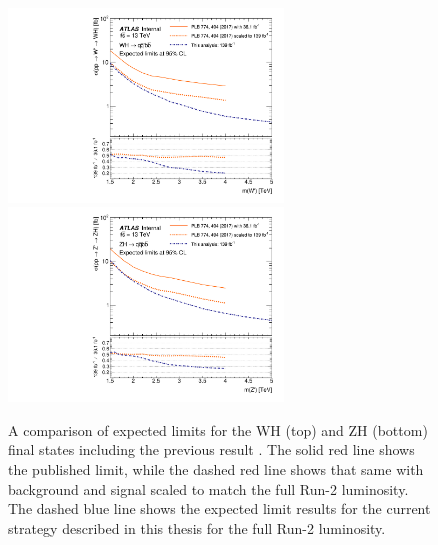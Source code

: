 \begin{figure}[htbp!]
    \begin{center}
        \includegraphics[width=0.65\textwidth]{VHqqbbLimit_WH_2016_2019_v4.pdf} \\
        \includegraphics[width=0.65\textwidth]{VHqqbbLimit_ZH_2016_2019_v4.pdf}
    \end{center}
    \caption{
        A comparison of expected limits for the WH (top) and ZH (bottom) final states including the previous result \cite{Aaboud:2017ahz}.
        The solid red line shows the published limit, while the dashed red line shows that same with background and signal scaled to match the full Run-2 luminosity.
        The dashed blue line shows the expected limit results for the current strategy described in this thesis for the full Run-2 luminosity.
    }
    \label{fig:exp_limit_cmp}
\end{figure}

